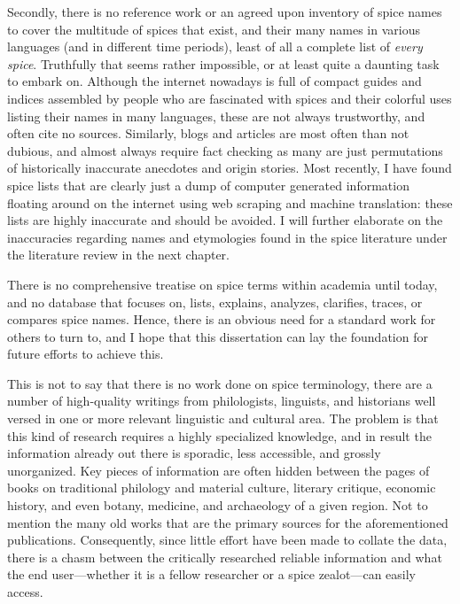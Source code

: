 Secondly, there is no reference work or an agreed upon inventory of spice names to cover the multitude of spices that exist, and their many names in various languages (and in different time periods), least of all a complete list of \emph{every spice}. Truthfully that seems rather impossible, or at least quite a daunting task to embark on. Although the internet nowadays is full of compact guides and indices assembled by people who are fascinated with spices and their colorful uses listing their names in many languages, these are not always trustworthy, and often cite no sources. Similarly, blogs and articles are most often than not dubious, and almost always require fact checking as many are just permutations of historically inaccurate anecdotes and origin stories. Most recently, I have found spice lists that are clearly just a dump of computer generated information floating around on the internet using web scraping and machine translation: these lists are highly inaccurate and should be avoided. I will further elaborate on the inaccuracies regarding names and etymologies found in the spice literature under the literature review in the next chapter.

There is no comprehensive treatise on spice terms within academia until today, and no database that focuses on, lists, explains, analyzes, clarifies, traces, or compares spice names. Hence, there is an obvious need for a standard work for others to turn to, and I hope that this dissertation can lay the foundation for future efforts to achieve this.

This is not to say that there is no work done on spice terminology, there are a number of high-quality writings from philologists, linguists, and historians well versed in one or more relevant linguistic and cultural area. The problem is that this kind of research requires a highly specialized knowledge, and in result the information already out there is sporadic, less accessible, and grossly unorganized. Key pieces of information are often hidden between the pages of books on traditional philology and material culture, literary critique, economic history, and even botany, medicine, and archaeology of a given region. Not to mention the many old works that are the primary sources for the aforementioned publications. Consequently, since little effort have been made to collate the data, there is a chasm between the critically researched reliable information and what the end user---whether it is a fellow researcher or a spice zealot---can easily access.



